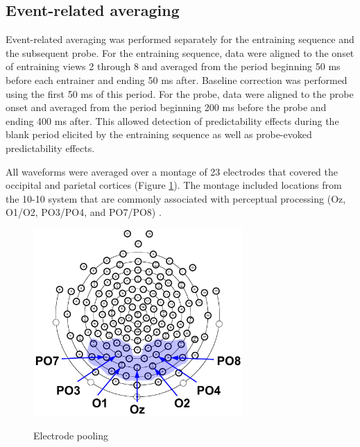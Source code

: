 \documentclass[dwyatte_dissertation.tex]{subfiles}
\begin{document}
\subsection{Event-related averaging}
Event-related averaging was performed separately for the entraining sequence and the subsequent probe. For the entraining sequence, data were aligned to the onset of entraining views 2 through 8 and averaged from the period beginning 50 ms before each entrainer and ending 50 ms after. Baseline correction was performed using the first 50 ms of this period. For the probe, data were aligned to the probe onset and averaged from the period beginning 200 ms before the probe and ending 400 ms after. This allowed detection of predictability effects during the blank period elicited by the entraining sequence as well as probe-evoked predictability effects.


All waveforms were averaged over a montage of 23 electrodes that covered the occipital and parietal cortices (Figure \ref{fig:channels}). The montage included locations from the 10-10 system that are commonly associated with perceptual processing (Oz, O1/O2, PO3/PO4, and PO7/PO8) \cite[e.g.,]{DohertyRaoMesulamEtAl05,RohenkohlNobre11,FahrenfortScholteLamme07}.

\begin{figure}[h!]
\begin{center}
\includegraphics[width=80mm]{figs/pleast/channels_all.pdf}
\end{center}
\caption{Electrode pooling}{}
\label{fig:channels}
\end{figure}
\end{document}
